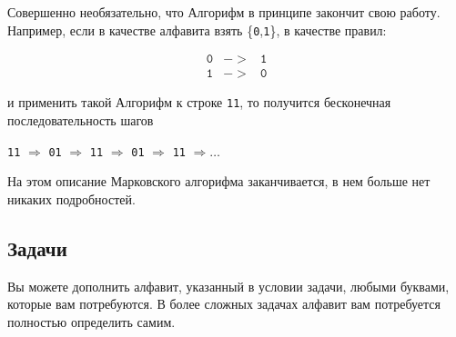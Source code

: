 \documentclass[12pt,a4paper,oneside]{article}
\newcommand{\s}[1]{\texttt{#1}}
\begin{document}
Совершенно необязательно, что Алгорифм в принципе закончит свою работу. 
Например, если в качестве алфавита взять \{\s{0},\s{1}\}, 
в качестве правил:
\begin{bnf}\begin{eqnarray*}
   \s{0}&->&\s{1}\\
   \s{1}&->&\s{0}
\end{eqnarray*}\end{bnf}и применить такой Алгорифм к строке \s{11}, то 
получится бесконечная последовательность шагов \begin{center}\s{11} 
$\Rightarrow$ \s{01} $\Rightarrow$ \s{11} $\Rightarrow$ \s{01} 
$\Rightarrow$ \s{11} $\Rightarrow \dots$\end{center}

На этом описание Марковского алгорифма заканчивается, в нем больше нет
никаких подробностей. 

\subsection{Задачи}

Вы можете дополнить алфавит, указанный в условии задачи, любыми буквами, 
которые вам потребуются. В более сложных задачах алфавит вам потребуется 
полностью определить самим. 
\end{document}
